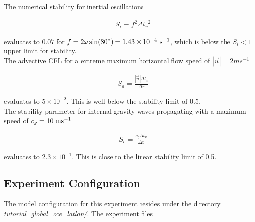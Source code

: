 \noindent The numerical stability for inertial oscillations
\citep{adcroft:95}

\begin{eqnarray}
\label{eq:eg-global-inertial_stability}
&& S_{i} = f^{2} {\Delta t_v}^2
\end{eqnarray}

\noindent evaluates to $0.07$ for
$f=2\omega\sin(80^{\circ})=1.43\times10^{-4}~{\rm s}^{-1}$, which is
below the $S_{i} < 1$ upper limit for stability.
\\

\noindent The advective CFL \citep{adcroft:95} for a extreme maximum
horizontal flow
speed of $ | \vec{u} | = 2 ms^{-1}$

\begin{eqnarray}
\label{eq:eg-global-cfl_stability}
&& S_{a} = \frac{| \vec{u} | \Delta t_{v}}{ \Delta x}
\end{eqnarray}

\noindent evaluates to $5 \times 10^{-2}$. This is well below the stability
limit of 0.5.
\\

\noindent The stability parameter for internal gravity waves propagating
 with a maximum speed of $c_{g}=10~{\rm ms}^{-1}$
\citep{adcroft:95}

\begin{eqnarray}
\label{eq:eg-global-gfl_stability}
&& S_{c} = \frac{c_{g} \Delta t_{v}}{ \Delta x}
\end{eqnarray}

\noindent evaluates to $2.3 \times 10^{-1}$. This is close to the linear
stability limit of 0.5.

\subsection{Experiment Configuration}
\label{sec:eg-global-clim_ocn_examp_exp_config}

The model configuration for this experiment resides under the
directory {\it tutorial\_global\_oce\_latlon/}. The experiment files


